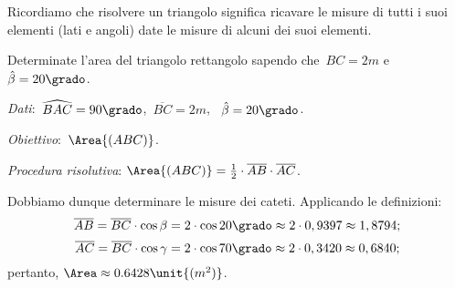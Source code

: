 Ricordiamo che risolvere un triangolo significa ricavare le misure di tutti i 
suoi elementi (lati e angoli) date le misure di alcuni dei suoi elementi.

 \begin{esempio}
Determinate l'area del triangolo rettangolo sapendo che~${BC}=2\unit{m}$ 
e~$\hat{\beta} =20\grado$.

\emph{Dati}:~$\widehat{BAC}=90\grado$,\quad~$\overline{BC}=2\unit{m}$,
\quad~$\hat{\beta}=20\grado$.

\emph{Obiettivo}:~$\Area{(ABC)}$.

\emph{Procedura risolutiva}:
$\Area{(ABC)}=\frac{1}{2}\cdot \overline{AB}\cdot \overline{AC}$.

Dobbiamo dunque determinare le misure dei cateti. Applicando le definizioni:
\[\overline{AB}=\overline{BC}\cdot {\cos \beta}=2\cdot 
{\cos 20\grado} \approx2\cdot 0,9397\approx1,8794;\]
\[\overline{AC}=\overline{BC}\cdot {\cos \gamma}=2\cdot 
{\cos 70\grado} \approx2\cdot 0,3420\approx0,6840;\]
pertanto, $\Area\approx0.6428\unit{(m^{2})}$.
 \end{esempio}

